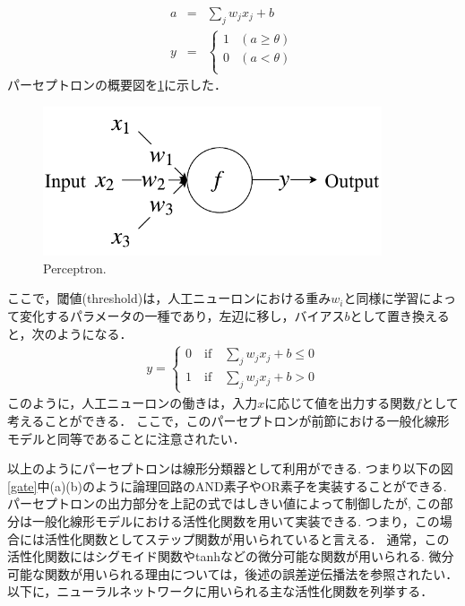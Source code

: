     \begin{eqnarray}
        a&=&\sum_{j}w_{j}x_{j}+b \nonumber \\
        y&=&\left
                \{
                \begin{array}{ll}
                1 & (a\geq \theta) \\
                0 & (a<\theta) \\
                \end{array}
            \right.
        \label{neuron}
    \end{eqnarray}
    パーセプトロンの概要図を\ref{perceptron}に示した．
    \begin{figure}[ht]
      \centering
      \includegraphics[width=10cm]{8_appendix/img/perceptron.pdf}
      \caption{Perceptron.}
      \label{perceptron}
    \end{figure}
    ここで，閾値(threshold)は，人工ニューロンにおける重み$w_{i}$と同様に学習によって変化するパラメータの一種であり，左辺に移し，バイアス$b$として置き換えると，次のようになる．
    \begin{align}
      y =   \begin{cases}
                0 \quad\text{if}\quad \sum_{j}w_{j}x_{j} + b \leq 0 \\
                1 \quad\text{if}\quad \sum_{j}w_{j}x_{j} + b > 0
            \end{cases}
    \end{align}
    このように，人工ニューロンの働きは，入力$x$に応じて値を出力する関数$f$として考えることができる．
    ここで，このパーセプトロンが前節における一般化線形モデルと同等であることに注意されたい．

    以上のようにパーセプトロンは線形分類器として利用ができる.
    つまり以下の図\ref{gate}中(a)(b)のように論理回路のAND素子やOR素子を実装することができる.
    パーセプトロンの出力部分を上記の式ではしきい値によって制御したが, この部分は一般化線形モデルにおける活性化関数を用いて実装できる.
    つまり，この場合には活性化関数としてステップ関数が用いられていると言える．
    通常，この活性化関数にはシグモイド関数やtanhなどの微分可能な関数が用いられる.
    微分可能な関数が用いられる理由については，後述の誤差逆伝播法を参照されたい．
    以下に，ニューラルネットワークに用いられる主な活性化関数を列挙する．
    
